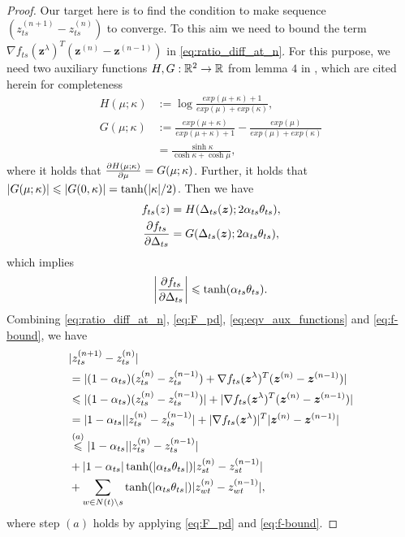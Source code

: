 \begin{proof}
  Our target here is to find the condition to make sequence $\left( z_{ts}^{(n+1)} - z_{ts}^{(n)} \right)$ to converge. To this aim we need to bound the term $\nabla f_{ts}(\bm{z}^{\lambda})^{T} (\bm{z}^{(n)} - \bm{z}^{(n-1)})$ in \eqref{eq:ratio_diff_at_n}. For this purpose, we need two auxiliary functions $H, G: \mathbb{R}^2 \rightarrow \mathbb{R}$ from lemma $4$ in \cite{roosta2008reweighed_sum_product}, which are cited herein for completeness
  \begin{align}
    H(\mu; \kappa) &:= \log \frac{exp(\mu + \kappa) +1}{exp(\mu) + exp(\kappa)}, \nonumber \\
    G(\mu; \kappa) &:= \frac{exp(\mu + \kappa)}{exp(\mu + \kappa) + 1} - \frac{exp(\mu)}{exp(\mu) + exp(\kappa)} \nonumber \\
                   &= \frac{\sinh{\kappa}}{\cosh{\kappa} + \cosh{\mu}},
  \end{align}
  where it holds that $\frac{ \partial H(\mu; \kappa)}{\partial \mu} = G(\mu; \kappa)$. Further, it holds that
  $| G(\mu; \kappa) | \leqslant | G(0, \kappa) | = \tanh(| \kappa |/2)$.
  Then we have
  \begin{align}\label{eq:eqv_aux_functions}
    f_{ts}(z) &= H(\Delta_{ts}(\bm{z}) ;2 \alpha_{ts} \theta_{ts}), \nonumber \\
    \frac{ \partial f_{ts}}{\partial \Delta_{ts}} &= G(\Delta_{ts}(\bm{z}) ;2 \alpha_{ts} \theta_{ts}),
  \end{align}
  which implies
  \begin{equation}\label{eq:f-bound}
    \bigg|{\frac{ \partial f_{ts}}{\partial \Delta_{ts}}}\bigg| \leqslant \tanh(\alpha_{ts}\theta_{ts}).
  \end{equation}
  Combining \eqref{eq:ratio_diff_at_n}, \eqref{eq:F_pd}, \eqref{eq:eqv_aux_functions} and \eqref{eq:f-bound}, we have
  \begin{align}\label{eq:ratio_cvg_step}
    &| z_{ts}^{(n+1)} - z_{ts}^{(n)} | \nonumber\\
    & = | (1-\alpha_{ts}) (z_{ts}^{(n)} - z_{ts}^{(n-1)}) + \nabla f_{ts}(\bm{z}^{\lambda})^{T} (\bm{z}^{(n)} - \bm{z}^{(n-1)}) | \nonumber \\
    & \leqslant | (1-\alpha_{ts}) (z_{ts}^{(n)} - z_{ts}^{(n-1)}) | + | \nabla f_{ts}(\bm{z}^{\lambda})^{T} (\bm{z}^{(n)} - \bm{z}^{(n-1)}) | \nonumber \\
    & = |  1 - \alpha_{ts} | | z_{ts}^{(n)} - z_{ts}^{(n-1)} | + | \nabla f_{ts}(\bm{z}^{\lambda}) |^{T} | \bm{z}^{(n)} - \bm{z}^{(n-1)} | \nonumber \\
    & \overset{(a)}{\leqslant} |  1 - \alpha_{ts} | | z_{ts}^{(n)} - z_{ts}^{(n-1)} | \nonumber \\
    &+ |  1 - \alpha_{ts} | \tanh(| \alpha_{ts} \theta_{ts} |) | z_{st}^{(n)} - z_{st}^{(n-1)} | \nonumber \\
    &+ \sum_{w\in N(t)\backslash s} \tanh(| \alpha_{ts} \theta_{ts} |) | z_{wt}^{(n)} - z_{wt}^{(n-1)} |,
  \end{align}
  where step $(a)$ holds by applying \eqref{eq:F_pd} and \eqref{eq:f-bound}.


\end{proof}
